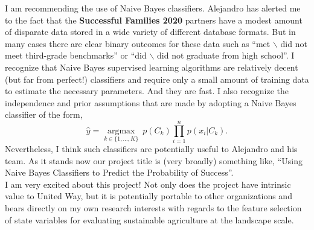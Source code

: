 \documentclass[letterpaper,11pt]{texMemo}
\begin{document}
I am recommending the use of Naive Bayes classifiers. Alejandro has alerted me to the fact that the \textbf{Successful Families 2020} partners have a modest amount of disparate data stored in a wide variety of different database formats. But in many cases there are clear binary outcomes for these data such as \enquote{met $\backslash $ did not meet third-grade benchmarks} or \enquote{did $\backslash $ did not graduate from high school}. I recognize that Naive Bayes supervised learning algorithms are relatively decent (but far from perfect!) classifiers and require only a small amount of training data to estimate the necessary parameters. And they are fast. I also recognize the independence and prior assumptions that are made by adopting a Naive Bayes classifier of the form, 
\begin{equation*}
\hat{y} = \underset{k \in \{1, \dots, K\}}{\operatorname{argmax}} \ p(C_k) \displaystyle\prod_{i=1}^n p(x_i \vert C_k).
\end{equation*}
Nevertheless, I think such classifiers are potentially useful to Alejandro and his team. As it stands now our project title is (very broadly) something like, \enquote{Using Naive Bayes Classifiers to Predict the Probability of Success}.\\

I am very excited about this project! Not only does the project have intrinsic value to United Way, but it is potentially portable to other organizations and bears directly on my own research interests with regards to the feature selection of state variables for evaluating sustainable agriculture at the landscape scale.
\end{document}
